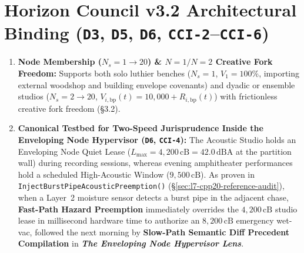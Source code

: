 \section{Horizon Council v3.2 Architectural Binding (\texttt{D3}, \texttt{D5}, \texttt{D6}, \texttt{CCI-2}--\texttt{CCI-6})}
\begin{enumerate}
    \item \textbf{Node Membership ($N_s = 1 \to 20$) \& $N=1 / N=2$ Creative Fork Freedom:} Supports both solo luthier benches ($N_s = 1$, $V_1 = 100\%$, importing external woodshop and building envelope covenants) and dyadic or ensemble studios ($N_s = 2 \to 20$, $V_{i,\mathrm{bp}}(t) = 10{,}000 + R_{i,\mathrm{bp}}(t)$) with frictionless creative fork freedom (\S 3.2).
    \item \textbf{Canonical Testbed for Two-Speed Jurisprudence Inside the Enveloping Node Hypervisor (\texttt{D6}, \texttt{CCI-4}):} The Acoustic Studio holds an Enveloping Node Quiet Lease ($L_{\max} = 4{,}200\,\mathrm{cB} = 42.0\,\mathrm{dBA}$ at the partition wall) during recording sessions, whereas evening amphitheater performances hold a scheduled High-Acoustic Window ($9{,}500\,\mathrm{cB}$). As proven in \texttt{InjectBurstPipeAcousticPreemption()} (\S\ref{sec:l7-cpp20-reference-audit}), when a Layer~2 moisture sensor detects a burst pipe in the adjacent chase, \textbf{Fast-Path Hazard Preemption} immediately overrides the $4{,}200\,\mathrm{cB}$ studio lease in millisecond hardware time to authorize an $8{,}200\,\mathrm{cB}$ emergency wet-vac, followed the next morning by \textbf{Slow-Path Semantic Diff Precedent Compilation} in \textbf{\textit{The Enveloping Node Hypervisor Lens}}.
\end{enumerate}

